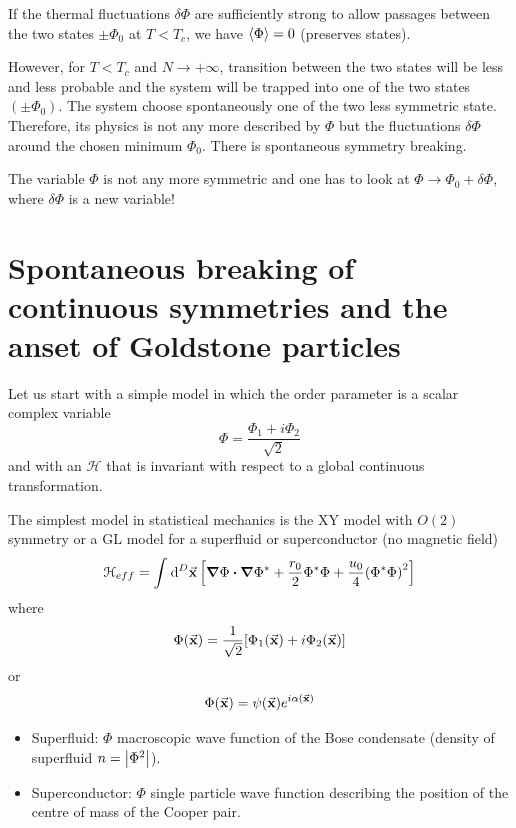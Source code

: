 \documentclass[../main/main.tex]{subfiles}
\begin{document}
\begin{remark}
If the thermal fluctuations \( \delta \Phi  \) are sufficiently strong to allow passages between the two states \( \pm \Phi _0 \) at \( T < T_c \), we have \( \expval{\Phi } = 0  \) (preserves states).
\end{remark}
However, for \( T < T_c \) and \( N \rightarrow + \infty  \), transition between the two states will be less and less probable and the system will be trapped into one of the two states \( (\pm \Phi _0) \). The system choose spontaneously one of the two less symmetric state. Therefore, its physics is not any more described by \( \Phi  \) but the fluctuations \( \delta \Phi  \) around the chosen minimum \( \Phi _0 \). There is spontaneous symmetry breaking.

The variable \( \Phi  \) is not any more symmetric and one has to look at \( \Phi \rightarrow \Phi _0 + \delta \Phi  \), where \( \delta \Phi  \) is a new variable!


\section{Spontaneous breaking of continuous symmetries and the anset of Goldstone particles}
Let us start with a simple model in which the order parameter is a scalar complex variable
\begin{equation}
  \Phi = \frac{\Phi _1 + i \Phi _2}{\sqrt{2} }
\end{equation}
and with an \( \mathcal{H} \) that is invariant with respect to a global continuous transformation.

The simplest model in statistical mechanics is the XY model with \( O(2) \) symmetry or a GL model for a superfluid or superconductor (no magnetic field)
\begin{equation}
  \mathcal{H}_{eff} = \int_{}^{} \dd[D]{\va{x}} \qty[\grad \Phi \vdot \grad \Phi ^* + \frac{r_0}{2} \Phi ^* \Phi + \frac{u_0}{4} \qty(\Phi ^* \Phi )^2 ]
\end{equation}
where
\begin{equation}
  \Phi (\va{x}) = \frac{1}{\sqrt{2} } \qty[ \Phi _1 (\va{x}) + i \Phi _2 (\va{x})]
\end{equation}
or
\begin{equation}
  \Phi (\va{x}) = \psi (\va{x}) e^{i \alpha (\va{x})}
\end{equation}
\begin{itemize}
\item Superfluid: \( \Phi  \) macroscopic wave function of the Bose condensate (density of superfluid \( n= \abs{\Phi ^2}  \)).
\item Superconductor: \( \Phi  \) single particle wave function describing the position of the centre of mass of the Cooper pair.
\end{itemize}
\end{document}
